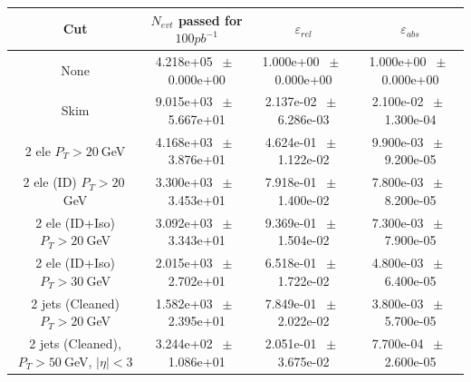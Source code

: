 \begin{table}[htbp] 
\begin{center} 
\begin{tabular}{|c|c|c|c|} 
\hline\hline 
 Cut & $N_{evt}$ passed for $100pb^{-1}$ & $\varepsilon_{rel}$ & $\varepsilon_{abs}$ \\ 
\hline\hline 
None          &           4.218e+05          $~\pm~$          0.000e+00           &           1.000e+00          $~\pm~$          0.000e+00           &           1.000e+00          $~\pm~$          0.000e+00          \\          
          Skim          &           9.015e+03          $~\pm~$          5.667e+01           &           2.137e-02          $~\pm~$          6.286e-03           &           2.100e-02          $~\pm~$          1.300e-04          \\          
          2 ele $P_T>20~$GeV          &           4.168e+03          $~\pm~$          3.876e+01           &           4.624e-01          $~\pm~$          1.122e-02           &           9.900e-03          $~\pm~$          9.200e-05          \\          
          2 ele (ID) $P_T>20~$GeV          &           3.300e+03          $~\pm~$          3.453e+01           &           7.918e-01          $~\pm~$          1.400e-02           &           7.800e-03          $~\pm~$          8.200e-05          \\          
          2 ele (ID+Iso) $P_T>20~$GeV          &           3.092e+03          $~\pm~$          3.343e+01           &           9.369e-01          $~\pm~$          1.504e-02           &           7.300e-03          $~\pm~$          7.900e-05          \\          
          2 ele (ID+Iso) $P_T>30~$GeV          &           2.015e+03          $~\pm~$          2.702e+01           &           6.518e-01          $~\pm~$          1.722e-02           &           4.800e-03          $~\pm~$          6.400e-05          \\          
          2 jets (Cleaned) $P_T>20~$GeV          &           1.582e+03          $~\pm~$          2.395e+01           &           7.849e-01          $~\pm~$          2.022e-02           &           3.800e-03          $~\pm~$          5.700e-05          \\          
          2 jets (Cleaned), $P_T>50~$GeV, $ | \eta |<3$          &           3.244e+02          $~\pm~$          1.086e+01           &           2.051e-01          $~\pm~$          3.675e-02           &           7.700e-04          $~\pm~$          2.600e-05          \\          

\end{tabular}
\end{center}
\end{table}
